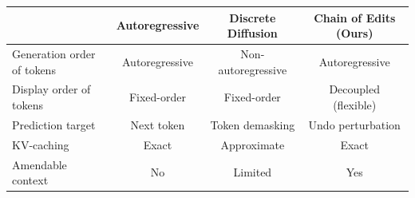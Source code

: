 

\begin{minipage}{14cm}
\centering
\begin{tabular}{lccc}
    \toprule
    & Autoregressive & Discrete Diffusion & Chain of Edits (Ours) \\
    \midrule
    Generation order of tokens    & Autoregressive & Non-autoregressive & Autoregressive \\
    Display order of tokens   & Fixed-order & Fixed-order & Decoupled (flexible) \\
    Prediction target   & Next token & Token demasking & Undo perturbation \\
    KV-caching   & Exact & Approximate & Exact \\
    Amendable context   & No & Limited & Yes \\
    \bottomrule
\end{tabular}
\end{minipage}

